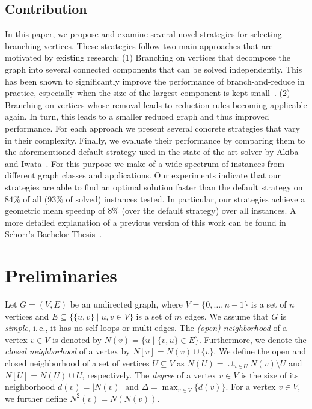 \documentclass[a4paper,UKenglish,cleveref, autoref, thm-restate]{lipics-v2021}
\newcommand{\ie}{i.\,e.,\xspace}
\begin{document}
\subsection{Contribution}
In this paper, we propose and examine several novel strategies for selecting branching vertices.
These strategies follow two main approaches that are motivated by existing research: (1) Branching on vertices that decompose the graph into several connected components that can be solved independently.
This has been shown to significantly improve the performance of branch-and-reduce in practice, especially when the size of the largest component is kept small~\cite{alsahafy2020computing}.
(2) Branching on vertices whose removal leads to reduction rules becoming applicable again.
In turn, this leads to a smaller reduced graph and thus improved performance.
For each approach we present several concrete strategies that vary in their complexity.
Finally, we evaluate their performance by comparing them to the aforementioned default strategy used in the state-of-the-art solver by Akiba and Iwata~\cite{AkibaIwata}.
For this purpose we make of a wide spectrum of instances from different graph classes and applications.
Our experiments indicate that our strategies are able to find an optimal solution faster than the default strategy on $84\%$ of all ($93\%$ of solved) instances tested.
In particular, our strategies achieve a geometric mean speedup of $8\%$ (over the default strategy) over all instances.
A more detailed explanation of a previous version of this work
can be found in Schorr's Bachelor Thesis~\cite{schorr2020improved}.

\section{Preliminaries}
Let $G=(V,E)$ be an undirected graph, where $V = \{0, \ldots, n-1\}$ is a set of $n$ vertices and $E \subseteq  \{\{u,v\} \mid u,v \in V\}$ is a set of $m$ edges. 
We assume that $G$ is \emph{simple}, \ie it has no self loops or multi-edges.
The \emph{(open) neighborhood} of a vertex $v \in V$ is denoted by $N(v) = \{u \mid \{v,u\} \in E\}$.
Furthermore, we denote the \emph{closed neighborhood} of a vertex by $N[v]=N(v) \cup \{v\}$.
We define the open and closed neighborhood of a set of vertices $U \subseteq V$
as $N(U) = \cup_{u \in U} N(v) \setminus U$ and $N[U] = N(U) \cup U$, respectively.
The \emph{degree} of a vertex $v \in V$ is the size of its neighborhood $d(v) =
|N(v)|$ and $\Delta =
\max_{v \in V} \{d(v)\}$.
For a vertex $v \in V$, we further define $N^2(v) = N(N(v))$.
\end{document}
